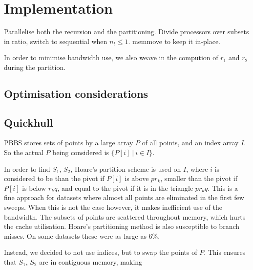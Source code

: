 \section{Implementation}

Parallelise both the recursion and the partitioning.
Divide processors over subsets in ratio, switch to sequential when $n_t \leq 1$.
memmove to keep it in-place.

In order to minimise bandwidth use, we also weave in the compution 
of $r_1$ and $r_2$ during the partition.

\iffalse
\subsection{Optimisation considerations}


\subsection{Quickhull}

PBBS stores sets of points by a large array $P$ of all points, and an index 
array $I$. So the actual $P$ being considered is $\{P[i] \ | \ i \in I\}$.

In order to find $S_1$, $S_2$, Hoare's partition scheme is used on $I$, where
$i$ is considered to be than the pivot if $P[i]$ is above $pr_k$, smaller than
the pivot if $P[i]$ is below $r_kq$, and equal to the pivot if it is in the
triangle $pr_kq$. This is a fine approach for datasets where almost all points
are eliminated in the first few sweeps. When this is not the case however,
it makes inefficient use of the bandwidth. The subsets of points are scattered
throughout memory, which hurts the cache utilisation. Hoare's partitioning
method is also susceptible to branch misses. On some datasets these were as
large as $6\%$.

Instead, we decided to not use indices, but to swap the points of $P$. This 
ensures that $S_1$, $S_2$ are in contiguous memory, making 


